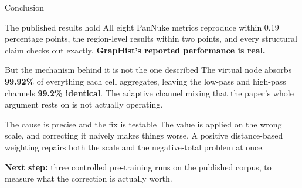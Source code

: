 \documentclass[aspectratio=169,11pt]{beamer}
\begin{document}
\begin{frame}{Conclusion}

  \begin{block}{The published results hold}
    \small All eight PanNuke metrics reproduce within 0.19 percentage points, the
    region-level results within two points, and every structural claim checks out
    exactly. \textbf{GrapHist's reported performance is real.}
  \end{block}

  \vspace{0.3em}
  \begin{alertblock}{But the mechanism behind it is not the one described}
    \small The virtual node absorbs \textbf{99.92\%} of everything each cell
    aggregates, leaving the low-pass and high-pass channels \textbf{99.2\%
    identical}. The adaptive channel mixing that the paper's whole argument rests
    on is not actually operating.
  \end{alertblock}

  \vspace{0.3em}
  \begin{block}{The cause is precise and the fix is testable}
    \small The value is applied on the wrong scale, and correcting it naively
    makes things worse. A positive distance-based weighting repairs both the
    scale and the negative-total problem at once.
  \end{block}

  \vspace{0.4em}
  {\small \textbf{Next step:} three controlled pre-training runs on the published
  corpus, to measure what the correction is actually worth.}

\end{frame}

\appendix
\end{document}
